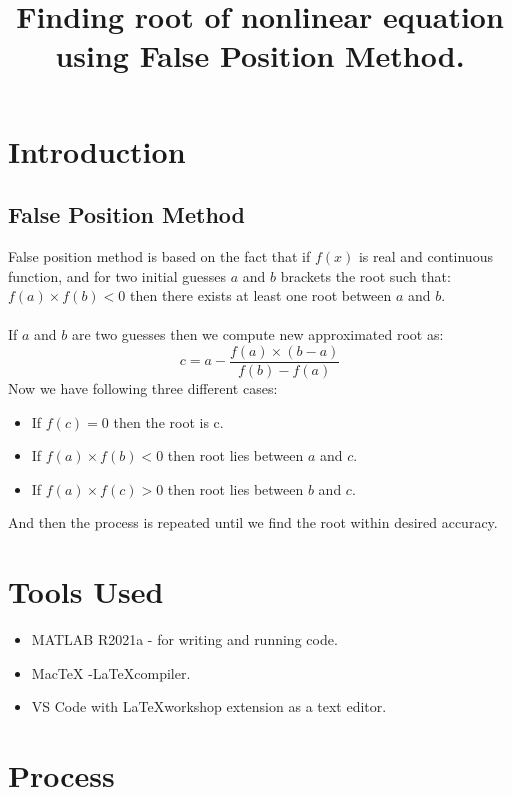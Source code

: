 \clearpage
\title{Finding root of nonlinear equation using False Position Method.}
\author{}
\date{}
\maketitle

\section*{Introduction}
\subsection*{False Position Method}
False position method is based on the fact that if $f(x)$ is real and continuous function, and for two initial guesses $a$ and $b$ brackets the root such that: $f(a)\times f(b) < 0$ then there exists at least one root between $a$ and $b$.\\\\
If $a$ and $b$ are two guesses then we compute new approximated root as:
\[c = a - \frac{f(a)\times (b-a)}{f(b) - f(a)}\]
Now we have following three different cases:
\begin{itemize}
    \item If $f(c)=0$ then the root is c.
    \item If $f(a)\times f(b)< 0$ then root lies between $a$ and $c$.
    \item If $f(a)\times f(c)> 0$ then root lies between $b$ and $c$.
\end{itemize}
And then the process is repeated until we find the root within desired accuracy.\cite{falsePos}


\section*{Tools Used}
\begin{itemize}
    \item MATLAB R2021a - for writing and running code.
    \item MacTeX -\LaTeX  compiler.
    \item VS Code with \LaTeX workshop extension as a text editor.
\end{itemize}

\section*{Process}

